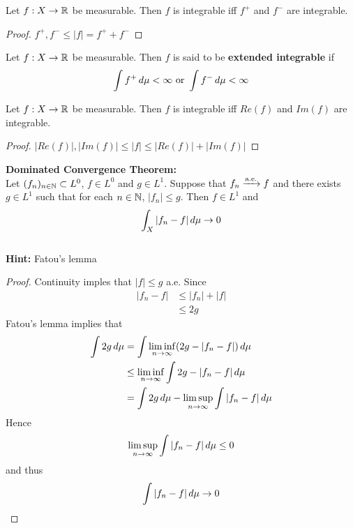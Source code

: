 \documentclass{book}
\begin{document}
	\begin{ex} 
		Let $f:X \rightarrow \mathbb{R}$ be measurable. Then $f$ is integrable iff $f^+$ and $f^-$ are integrable. 
	\end{ex}
	
	\begin{proof}
		$f^+,f^- \leq |f| = f^+ + f^-$
	\end{proof}
	
	\begin{defn}  
		Let $f:X \rightarrow \mathbb{R}$ be measurable. Then $f$ is said to be \textbf{extended integrable} if $$\int f^+ \, d \mu  < \infty \text{ or } \int f^- \, d \mu < \infty$$
	\end{defn}
	
	\begin{ex} 
		Let $f:X \rightarrow \mathbb{R}$ be measurable. Then $f$ is integrable iff $Re(f)$ and $Im(f)$ are integrable.
	\end{ex}
	
	\begin{proof}
		$|Re(f)|, |Im(f)| \leq |f| \leq |Re(f)| + |Im(f)|$
	\end{proof}
	
	\begin{ex}  \textbf{Dominated Convergence Theorem:}\\
		Let $(f_n)_{n \in \mathbb{N}} \subset L^0$, $f \in L^0$ and $g \in L^1$. Suppose that $f_n \xrightarrow{\text{a.e.}} f$ and there exists $g \in L^1$ such that for each $n \in \mathbb{N}$, $|f_n| \leq g$. Then $f \in L^1$ and $$\int_X |f_n - f| \, d \mu \rightarrow 0$$ \\
		\textbf{Hint:} Fatou's lemma
	\end{ex}
	
	\begin{proof}
	Continuity imples that $|f| \leq g$ a.e. Since 
	\begin{align*}
	|f_n - f| 
	&\leq |f_n| + |f| \\
	&\leq 2g
	\end{align*}	 
	Fatou's lemma implies that 
	\begin{align*}
	\int 2g \, d \mu 
	&= \int \liminf \limits_{n \rightarrow \infty} (2g - |f_n - f|) \, d \mu \\
	&\leq \liminf \limits_{n \rightarrow \infty} \int 2g - |f_n - f| \, d \mu  \\
	&= \int 2g \, d \mu - \limsup \limits_{n \rightarrow \infty} \int |f_n -f| \, d \mu \\
	\end{align*}
	Hence $$ \limsup \limits_{n \rightarrow \infty} \int |f_n -f| \, d \mu \leq 0 $$ and thus $$\int |f_n -f| \, d \mu \rightarrow 0$$
	\end{proof}
\end{document}
